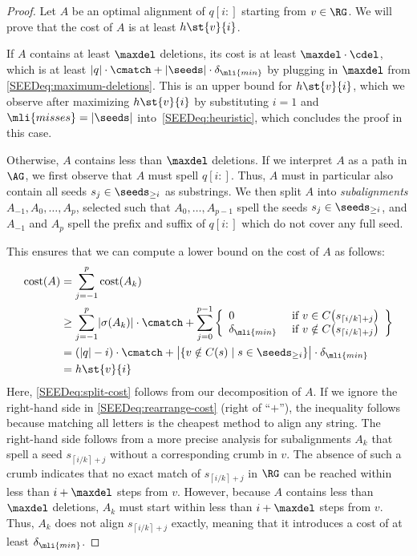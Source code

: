 \begin{proof}
	Let $A$ be an optimal alignment of $q[i{:}]$ starting from $v \in \RG$. We
	will prove that the cost of $A$ is at least $h\st{v}{i}$.

	If $A$ contains at least $\maxdel$ deletions, its cost is at least $\maxdel
	\cdot \cdel$, which is at least $|q| \cdot \cmatch + |\seeds| \cdot
	\delta_{\mli{min}}$ by plugging in $\maxdel$ from
	\cref{SEEDeq:maximum-deletions}. This is an upper bound for $h\st{v}{i}$, which
	we observe after maximizing $h\st{v}{i}$ by substituting $i=1$ and
	$\mli{misses}=|\seeds|$ into~\cref{SEEDeq:heuristic}, which concludes the proof
	in this case.

	Otherwise, $A$ contains less than $\maxdel$ deletions.
	If we interpret $A$ as a path in $\AG$, we first observe that $A$ must spell
	$q[i{:}]$. Thus, $A$ must in particular also contain all seeds $s_j \in
	\seeds_{\geq i}$ as substrings. We then split $A$ into \emph{subalignments}
	$A_{-1}, A_0, \dots, A_{p}$, selected such that $A_0, \dots, A_{p-1}$ spell
	the seeds $s_j \in \seeds_{\geq i}$, and $A_{-1}$ and $A_p$ spell the prefix
	and suffix of $q[i{:}]$ which do not cover any full seed.

	This ensures that we can compute a lower bound on the cost of $A$ as
	follows:
	\begin{align}
		\text{cost}(A) 
		&= \sum_{j=-1}^{p} \text{cost}(A_k) \label{SEEDeq:split-cost} \\
		&\geq \sum_{j=-1}^{p} \lvert \sigma(A_k) \rvert \cdot \cmatch + \sum_{j=0}^{p-1} \left\{ \begin{array}{ll}
			0 & \text{ if } v \in C\!\left(s_{\left\lceil i/k \right\rceil + j}\right) \\
			\delta_\mli{min} & \text{ if } v \notin C\!\left(s_{\left\lceil i/k \right\rceil + j}\right)
		\end{array}\right\} \label{SEEDeq:rearrange-cost} \\
		&= (\lvert q \rvert - i) \cdot \cmatch + \big\lvert \{v \notin C(s) \mid s \in \seeds_{\geq i}\} \big\rvert \cdot \delta_\mli{min} \label{SEEDeq:various} \\
		&= h\st{v}{i} \label{SEEDeq:plug-in-heuristic}
	\end{align}
	Here, \cref{SEEDeq:split-cost} follows from our decomposition of $A$. If we
	ignore the right-hand side in \cref{SEEDeq:rearrange-cost} (right of ``$+$''),
	the inequality follows because matching all letters is the cheapest method
	to align any string. The right-hand side follows from a more precise
	analysis for subalignments $A_k$ that spell a seed $s_{\left\lceil i/k
	\right\rceil + j}$ without a corresponding crumb in $v$. The absence of such
	a crumb indicates that no exact match of $s_{\left\lceil i/k \right\rceil +
	j}$ in $\RG$ can be reached within less than $i + \maxdel$ steps from $v$.
	However, because $A$ contains less than $\maxdel$ deletions, $A_k$ must
	start within less than $i + \maxdel$ steps from $v$. Thus, $A_k$ does not
	align $s_{\left\lceil i/k \right\rceil + j}$ exactly, meaning that it
	introduces a cost of at least $\delta_\mli{min}$.


\end{proof}
